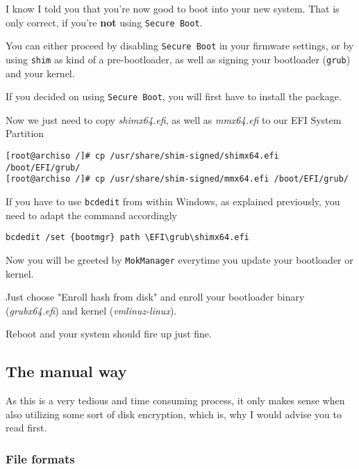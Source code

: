 \documentclass[10pt]{dustdoc}
\begin{document}
I know I told you that you’re now good to boot into your new system.
That is only correct, if you’re \textbf{not} using \texttt{Secure Boot}.

You can either proceed by disabling \texttt{Secure Boot} in your firmware settings, or by using \texttt{shim} as kind of a pre-bootloader, as well as signing your bootloader (\texttt{grub}) and your kernel.

If you decided on using \texttt{Secure Boot}, you will first have to install the package.

Now we just need to copy \textit{shimx64.efi}, as well as \textit{mmx64.efi} to our EFI System Partition

\begin{verbatim}
[root@archiso /]# cp /usr/share/shim-signed/shimx64.efi /boot/EFI/grub/
[root@archiso /]# cp /usr/share/shim-signed/mmx64.efi /boot/EFI/grub/
\end{verbatim}

\begin{NOTE}
    If you have to use \texttt{bcdedit} from within Windows, as explained previously, you need to adapt the command accordingly

    \begin{verbatim}
bcdedit /set {bootmgr} path \EFI\grub\shimx64.efi
    \end{verbatim}
\end{NOTE}

Now you will be greeted by \texttt{MokManager} everytime you update your bootloader or kernel.

Just choose "Enroll hash from disk" and enroll your bootloader binary (\textit{grubx64.efi}) and kernel (\textit{vmlinuz-linux}).

Reboot and your system should fire up just fine.

\subsection{The manual way}
\label{sec:the-manual-way}

\begin{WARNING}
    As this is a very tedious and time consuming process, it only makes sense when also utilizing some sort of disk encryption, which is, why I would advise you to read  first.
\end{WARNING}

\subsubsection{File formats}
\label{sec:file-formats}
\end{document}
